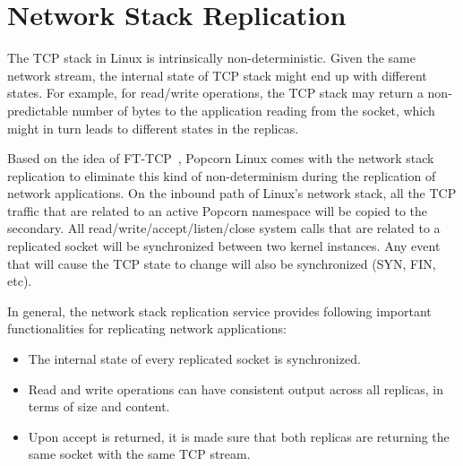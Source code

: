 \section{Network Stack Replication}
The TCP stack in Linux is intrinsically non-deterministic. Given the same network stream, the internal state of TCP stack might end up with different states. For example, for read/write operations, the TCP stack may return a non-predictable number of bytes to the application reading from the socket, which might in turn leads to different states in the replicas.

Based on the idea of FT-TCP~\cite{zagorodnov2003engineering}, Popcorn Linux comes with the network stack replication to eliminate this kind of non-determinism during the replication of network applications. On the inbound path of Linux's network stack, all the TCP traffic that are related to an active Popcorn namespace will be copied to the secondary. All read/write/accept/listen/close system calls that are related to a replicated socket will be synchronized between two kernel instances. Any event that will cause the TCP state to change will also be synchronized (SYN, FIN, etc).

In general, the network stack replication service provides following important functionalities for replicating network applications:
\begin{itemize}
\item The internal state of every replicated socket is synchronized.
\item Read and write operations can have consistent output across all replicas, in terms of size and content.
\item Upon accept is returned, it is made sure that both replicas are returning the same socket with the same TCP stream.
\end{itemize}